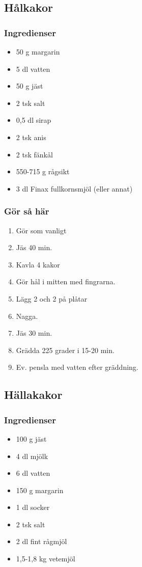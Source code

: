 \documentclass[a4paper,11pt,twocolumn]{article}
\begin{document}
\subsection{Hålkakor}
\subsubsection*{Ingredienser}
\begin{itemize}[noitemsep]
    \item 50 g margarin
    \item 5 dl vatten
    \item 50 g jäst
    \item 2 tsk salt
    \item 0,5 dl sirap
    \item 2 tsk anis
    \item 2 tsk fänkål
    \item 550-715 g rågsikt
    \item 3 dl Finax fullkornsmjöl (eller annat)
\end{itemize}
\subsubsection*{Gör så här}
\begin{enumerate}[label=\arabic*.]
    \item Gör som vanligt
    \item Jäs 40 min.
    \item Kavla 4 kakor
    \item Gör hål i mitten med fingrarna.
    \item Lägg 2 och 2 på plåtar
    \item Nagga.
    \item Jäs 30 min.
    \item Grädda 225 grader i 15-20 min.
    \item Ev. pensla med vatten efter gräddning.
\end{enumerate}



\subsection{Hällakakor}
\subsubsection*{Ingredienser}
\begin{itemize}[noitemsep]
    \item 100 g jäst
    \item 4 dl mjölk
    \item 6 dl vatten
    \item 150 g margarin
    \item 1 dl socker
    \item 2 tsk salt
    \item 2 dl fint rågmjöl
    \item 1,5-1,8 kg vetemjöl
\end{itemize}
\end{document}
